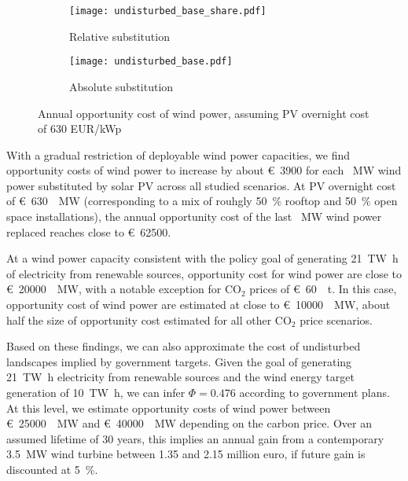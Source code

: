 \documentclass[review, 3p, times, 12pt]{elsarticle} %
\newcommand{\COO}{\ensuremath{\mathrm{CO_2}} }
\begin{document}
\begin{figure*}[h!t]
\centering
\begin{subfigure}[b]{0.475\textwidth}
\centering
\texttt{[image: undisturbed\_base\_share.pdf]}
\caption{Relative substitution}
\label{fig:rel_substitution}
\end{subfigure}
\hfill
\begin{subfigure}[b]{0.475\textwidth}
\centering
\texttt{[image: undisturbed\_base.pdf]}
\caption{Absolute substitution}
\label{fig:abs_substitution}
\end{subfigure}
\caption{Annual opportunity cost of wind power, assuming PV overnight cost of 630 EUR/kWp}
\label{figure:opportunity-cost-base}
\end{figure*}

With a gradual restriction of deployable wind power capacities, we find opportunity costs of wind power
to increase by about \SI{3900}[\euro]{} for each \SI{}{\mega\watt} wind power substituted by solar PV across all studied scenarios.
At PV overnight cost of \SI{630}[\euro]{\per\mega\watt} (corresponding to a mix of rouhgly \SI{50}{\percent} rooftop and
\SI{50}{\percent} open space installations), the annual opportunity cost of the last \SI{}{\mega\watt} wind power replaced reaches close to \SI{62500}[\euro]{}.

At a wind power capacity consistent with the policy goal of generating \SI{21}{\tera\watt\hour} of electricity
from renewable sources, opportunity cost for wind power are close to \SI{20000}[\euro]{\per\mega\watt}, with a
notable exception for \COO prices of \SI{60}[\euro]{\per\tonne}.
In this case, opportunity cost of wind power are estimated at close to \SI{10000}[\euro]{\per\mega\watt}, about half
the size of opportunity cost estimated for all other \COO price scenarios.

Based on these findings, we can also approximate the cost of undisturbed landscapes implied by government targets.
Given the goal of generating \SI{21}{\tera\watt\hour} electricity from renewable sources and the wind energy target
generation of \SI{10}{\tera\watt\hour}, we can infer $\Phi = 0.476$ according to government plans.
At this level, we estimate opportunity costs of wind power between \SI{25000}[\euro]{\per\mega\watt} and \SI{40000}[\euro]{\per\mega\watt} depending on the carbon price.
Over an assumed lifetime of $30$ years, this implies an annual gain from a contemporary \SI{3.5}{\mega\watt}
wind turbine between \SI{1.35}{} and \SI{2.15}{} million euro, if future gain is discounted at \SI{5}{\percent}.
\end{document}
